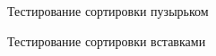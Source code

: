 \documentclass[12pt,a4paper]{report}
\begin{document}
\begin{figure}[h]
    \caption{Тестирование сортировки пузырьком}
    \label{fig:image}
\end{figure}

\begin{figure}[h]
    \caption{Тестирование сортировки вставками}
    \label{fig:image}
\end{figure}
\end{document}
